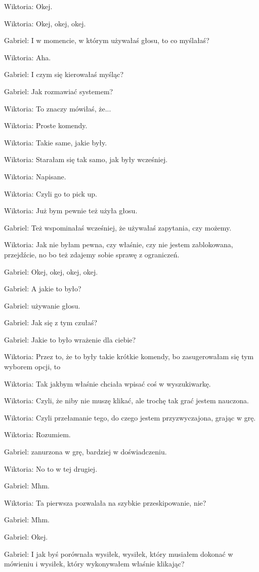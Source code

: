 Wiktoria: Okej.

Wiktoria: Okej, okej, okej.

Gabriel: I w momencie, w którym używałaś głosu, to co myślałaś?

Wiktoria: Aha.

Gabriel: I czym się kierowałaś myśląc?

Gabriel: Jak rozmawiać systemem?

Wiktoria: To znaczy mówiłaś, że...

Wiktoria: Proste komendy.

Wiktoria: Takie same, jakie były.

Wiktoria: Starałam się tak samo, jak były wcześniej.

Wiktoria: Napisane.

Wiktoria: Czyli go to pick up.

Wiktoria: Już bym pewnie też użyła głosu.

Gabriel: Też wspominałaś wcześniej, że używałaś zapytania, czy możemy.

Wiktoria: Jak nie byłam pewna, czy właśnie, czy nie jestem zablokowana, przejdźcie, no bo też zdajemy sobie sprawę z ograniczeń.

Gabriel: Okej, okej, okej, okej.

Gabriel: A jakie to było?

Gabriel: używanie głosu.

Gabriel: Jak się z tym czułaś?

Gabriel: Jakie to było wrażenie dla ciebie?

Wiktoria: Przez to, że to były takie krótkie komendy, bo zasugerowałam się tym wyborem opcji, to

Wiktoria: Tak jakbym właśnie chciała wpisać coś w wyszukiwarkę.

Wiktoria: Czyli, że niby nie muszę klikać, ale trochę tak grać jestem nauczona.

Wiktoria: Czyli przełamanie tego, do czego jestem przyzwyczajona, grając w grę.

Wiktoria: Rozumiem.

Gabriel: zanurzona w grę, bardziej w doświadczeniu.

Wiktoria: No to w tej drugiej.

Gabriel: Mhm.

Wiktoria: Ta pierwsza pozwalała na szybkie przeskipowanie, nie?

Gabriel: Mhm.

Gabriel: Okej.

Gabriel: I jak byś porównała wysiłek, wysiłek, który musiałem dokonać w mówieniu i wysiłek, który wykonywałem właśnie klikając?


